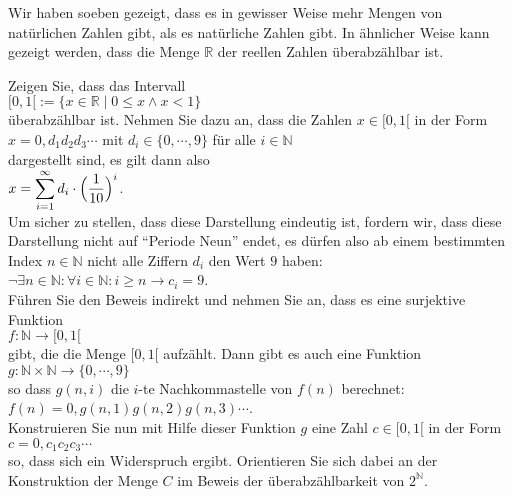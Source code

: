 \remark
Wir haben soeben gezeigt, dass es in gewisser Weise mehr Mengen von nat\"{u}rlichen Zahlen gibt, als es
nat\"{u}rliche Zahlen gibt.  In \"{a}hnlicher Weise kann gezeigt werden, dass die Menge $\mathbb{R}$ der reellen
Zahlen \"{u}berabz\"{a}hlbar ist.  

\exercise
Zeigen Sie, dass das Intervall
\\[0.2cm]
\hspace*{1.3cm}
$[0,1[ := \{ x \in \mathbb{R} \mid 0 \leq x \wedge x < 1 \}$ 
\\[0.2cm]
\"{u}berabz\"{a}hlbar ist.  Nehmen Sie dazu an, dass die Zahlen $x \in [0,1[$ in der Form
\\[0.2cm]
\hspace*{1.3cm}
$ x = 0, d_1 d_2 d_3 \cdots$ \quad mit $d_i \in \{ 0, \cdots, 9 \}$  f\"{u}r alle $i \in \mathbb{N}$
\\[0.2cm]
dargestellt sind, es gilt dann also
\\[0.2cm]
\hspace*{1.3cm}
$\displaystyle x = \sum\limits_{i=1}^\infty d_i \cdot \Bigl(\frac{1}{10}\Bigr)^{i}$.
\\[0.2cm]
Um sicher zu stellen, dass diese Darstellung eindeutig ist, fordern wir, dass diese Darstellung
nicht auf ``Periode Neun'' endet, es d\"{u}rfen also ab einem bestimmten Index $n \in \mathbb{N}$ nicht
alle Ziffern $d_i$ den Wert $9$ haben:
\\[0.2cm]
\hspace*{1.3cm}
$\neg \exists n \in \mathbb{N}: \forall i \in \mathbb{N}: i \geq n \rightarrow c_i = 9$.
\\[0.2cm]
F\"{u}hren Sie den Beweis indirekt und nehmen Sie an, dass es eine surjektive Funktion 
\\[0.2cm]
\hspace*{1.3cm}
$f: \mathbb{N} \rightarrow [0,1[$
\\[0.2cm]
gibt, die die Menge $[0,1[$ aufz\"{a}hlt.  Dann gibt es auch eine Funktion
\\[0.2cm]
\hspace*{1.3cm}
$g: \mathbb{N} \times \mathbb{N} \rightarrow \{0, \cdots, 9\}$
\\[0.2cm]
so dass $g(n,i)$ die $i$-te Nachkommastelle von $f(n)$ berechnet:
\\[0.2cm]
\hspace*{1.3cm}
$f(n) = 0,g(n,1) g(n,2) g(n,3) \cdots$.
\\[0.2cm]
Konstruieren Sie nun mit Hilfe dieser Funktion $g$ eine Zahl $c \in [0,1[$ in der Form
\\[0.2cm]
\hspace*{1.3cm}
$c = 0,c_1c_2c_3 \cdots$
\\[0.2cm]
so, dass sich ein Widerspruch ergibt.  Orientieren Sie sich dabei an der Konstruktion der Menge $C$ im
Beweis der \"{u}berabz\"{a}hlbarkeit von $2^\mathbb{N}$.  \exend

